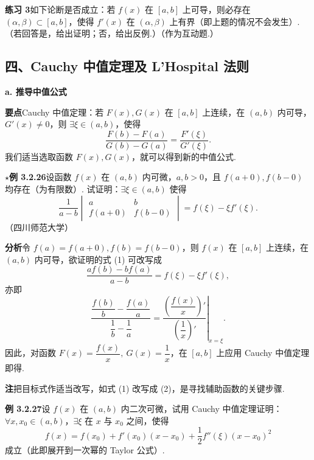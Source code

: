 \documentclass[UTF8, 12pt, fontset=fandol, oneside]{ctexart}
\begin{document}
\noindent\textbf{练习 3}\quad 如下论断是否成立：若 $f(x)$ 在 $[a,b]$ 上可导，则必存在 $(\alpha,\beta)\subset[a,b]$，使得 $f'(x)$ 在 $(\alpha,\beta)$ 上有界（即上题的情况不会发生）.（若回答是，给出证明；否，给出反例.）（作为互动题.）

\subsection*{四、Cauchy 中值定理及 L'Hospital 法则}

\noindent\textbf{a. 推导中值公式}

\noindent\textbf{要点}\quad Cauchy 中值定理：若 $F(x),G(x)$ 在 $[a,b]$ 上连续，在 $(a,b)$ 内可导，$G'(x)\ne0$，则 $\exists\xi\in(a,b)$，使得
\[
  \frac{F(b)-F(a)}{G(b)-G(a)}=\frac{F'(\xi)}{G'(\xi)}.
\]
我们适当选取函数 $F(x),G(x)$，就可以得到新的中值公式.

\noindent\textbf{$\star$例 3.2.26}\quad 设函数 $f(x)$ 在 $(a,b)$ 内可微，$a,b>0$，且 $f(a+0),f(b-0)$ 均存在（为有限数）. 试证明：$\exists\xi\in(a,b)$ 使得
\begin{equation}
  \frac1{a-b}
  \begin{vmatrix}
  a&b\\
  f(a+0)&f(b-0)
  \end{vmatrix}
  =f(\xi)-\xi f'(\xi).
\tag{1}
\end{equation}
（四川师范大学）

\noindent\textbf{分析}\quad 令 $f(a)=f(a+0),f(b)=f(b-0)$，则 $f(x)$ 在 $[a,b]$ 上连续，在 $(a,b)$ 内可导，欲证明的式 (1) 可改写成
\[
  \frac{af(b)-bf(a)}{a-b}=f(\xi)-\xi f'(\xi),
\]
亦即
\begin{equation}
  \frac{\dfrac{f(b)}b-\dfrac{f(a)}a}{\dfrac1b-\dfrac1a}
  =
  \left.\frac{\left(\dfrac{f(x)}x\right)'}{\left(\dfrac1x\right)'}\right|_{x=\xi}.
\tag{2}
\end{equation}
因此，对函数 $F(x)=\dfrac{f(x)}x,\ G(x)=\dfrac1x$，在 $[a,b]$ 上应用 Cauchy 中值定理即得.

\noindent\textbf{注}\quad 把目标式作适当改写，如式 (1) 改写成 (2)，是寻找辅助函数的关键步骤.

\noindent\textbf{例 3.2.27}\quad 设 $f(x)$ 在 $(a,b)$ 内二次可微，试用 Cauchy 中值定理证明：$\forall x,x_0\in(a,b)$，$\exists\xi$ 在 $x$ 与 $x_0$ 之间，使得
\begin{equation}
  f(x)=f(x_0)+f'(x_0)(x-x_0)+\frac12f''(\xi)(x-x_0)^2
\tag{1}
\end{equation}
成立（此即展开到一次幂的 Taylor 公式）.
\end{document}

